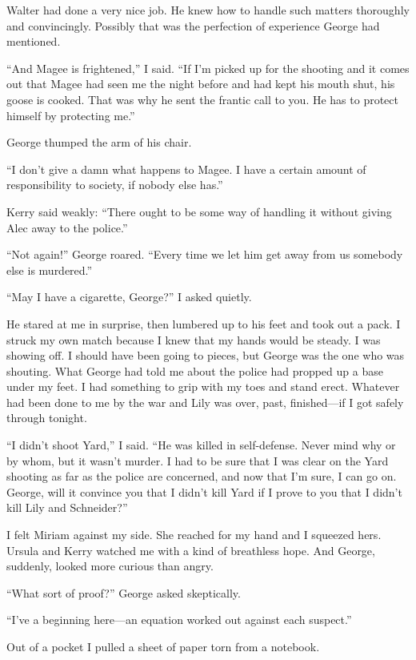 \documentclass{novel}
\begin{document}
Walter had done a very nice job. He knew how to handle such matters thoroughly and convincingly. Possibly that was the perfection of experience George had mentioned.

“And Magee is frightened,” I said. “If I’m picked up for the shooting and it comes out that Magee had seen me the night before and had kept his mouth shut, his goose is cooked. That was why he sent the frantic call to you. He has to protect himself by protecting me.”

George thumped the arm of his chair.

“I don’t give a damn what happens to Magee. I have a certain amount of responsibility to society, if nobody else has.”

Kerry said weakly: “There ought to be some way of handling it without giving Alec away to the police.”

“Not again!” George roared. “Every time we let him get away from us somebody else is murdered.”

“May I have a cigarette, George?” I asked quietly.

\scenestars

He stared at me in surprise, then lumbered up to his feet and took out a pack. I struck my own match because I knew that my hands would be steady. I was showing off. I should have been going to pieces, but George was the one who was shouting. What George had told me about the police had propped up a base under my feet. I had something to grip with my toes and stand erect. Whatever had been done to me by the war and Lily was over, past, finished—if I got safely through tonight.

“I didn’t shoot Yard,” I said. “He was killed in self-defense. Never mind why or by whom, but it wasn’t murder. I had to be sure that I was clear on the Yard shooting as far as the police are concerned, and now that I’m sure, I can go on. George, will it convince you that I didn’t kill Yard if I prove to you that I didn’t kill Lily and Schneider?”

I felt Miriam against my side. She reached for my hand and I squeezed hers. Ursula and Kerry watched me with a kind of breathless hope. And George, suddenly, looked more curious than angry.

“What sort of proof?” George asked skeptically.

“I’ve a beginning here—an equation worked out against each suspect.”

Out of a pocket I pulled a sheet of paper torn from a notebook.
\end{document}
